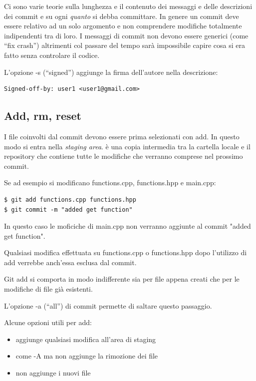 \documentclass{article} \usepackage[textwidth=18cm,textheight=18cm]{geometry}
\begin{document}
Ci sono varie teorie  sulla lunghezza e il contenuto dei messaggi e delle
descrizioni dei commit e su ogni \emph{quanto} si debba committare. In genere un
commit deve essere relativo ad un solo argomento e non comprendere modifiche
totalmente indipendenti tra di loro. I messaggi di commit non devono essere
generici (come ``fix crash'') altrimenti col passare del tempo sarà impossibile
capire cosa si era fatto senza controlare il codice.

L'opzione -s (``signed'') aggiunge la firma dell'autore nella descrizione:

\begin{verbatim}
Signed-off-by: user1 <user1@gmail.com>
\end{verbatim}

\subsection{Add, rm, reset}

I file coinvolti dal commit devono essere prima selezionati con add. In questo
modo si entra nella \textit{staging area}. è una copia intermedia tra la
cartella locale e il repository che contiene tutte le modifiche che verranno
comprese nel prossimo commit.

Se ad esempio si modificano functions.cpp, functions.hpp e main.cpp:

\begin{verbatim}
$ git add functions.cpp functions.hpp
$ git commit -m "added get function"
\end{verbatim}

In questo caso le moficiche di main.cpp non verranno aggiunte al commit "added
get function".

Qualsiasi modifica effettuata su functions.cpp o functions.hpp dopo l'utilizzo
di add verrebbe anch'essa esclusa dal commit.

Git add si comporta in modo indifferente sia per file appena creati che per le
modifiche di file già esistenti.

L'opzione -a (``all'') di commit permette di saltare questo passaggio.

Alcune opzioni utili per add:

\begin{itemize}
    \item {} aggiunge qualsiasi modifica all'area di staging
    \item {} come -A ma non aggiunge la rimozione dei file
    \item {} non aggiunge i nuovi file
\end{itemize}
\end{document}
